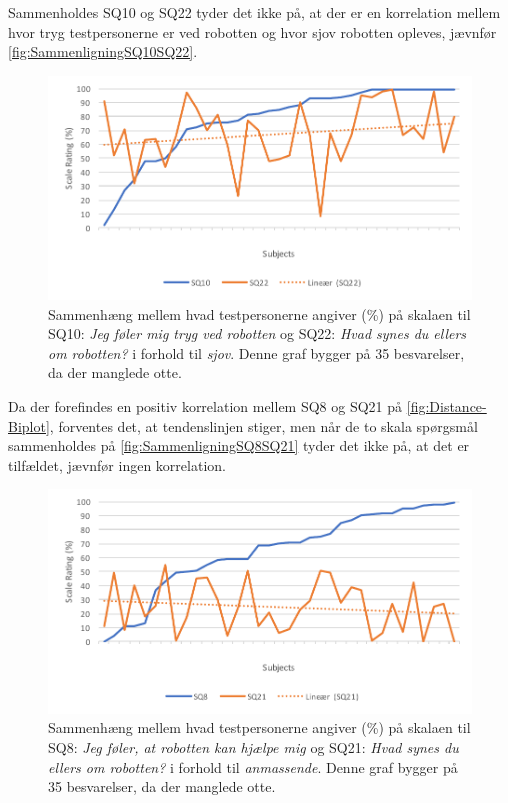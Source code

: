 Sammenholdes SQ10 og SQ22 tyder det ikke på, at der er en korrelation mellem hvor tryg testpersonerne er ved robotten og hvor sjov robotten opleves, jævnfør \autoref{fig:SammenligningSQ10SQ22}. 
%
\begin{figure}[H]
	\centering
	\includegraphics[width=\textwidth]{Figure/Korrelationsgrafer/SQ10+SQ22}
	\caption{Sammenhæng mellem hvad testpersonerne angiver (\%) på skalaen til SQ10: \textit{Jeg føler mig tryg ved robotten} og SQ22: \textit{Hvad synes du ellers om robotten?} i forhold til \textit{sjov}. Denne graf bygger på 35 besvarelser, da der manglede otte.}
	\label{fig:SammenligningSQ10SQ22}
\end{figure}
\noindent
%
Da der forefindes en positiv korrelation mellem SQ8 og SQ21 på \autoref{fig:Distance-Biplot}, forventes det, at tendenslinjen stiger, men når de to skala spørgsmål sammenholdes på \autoref{fig:SammenligningSQ8SQ21} tyder det ikke på, at det er tilfældet, jævnfør ingen korrelation.  
%
\begin{figure}[H]
	\centering
	\includegraphics[width=\textwidth]{Figure/Korrelationsgrafer/SQ8+SQ21}
	\caption{Sammenhæng mellem hvad testpersonerne angiver (\%) på skalaen til SQ8: \textit{Jeg føler, at robotten kan hjælpe mig} og SQ21: \textit{Hvad synes du ellers om robotten?} i forhold til \textit{anmassende}. Denne graf bygger på 35 besvarelser, da der manglede otte.}
	\label{fig:SammenligningSQ8SQ21}
\end{figure}
